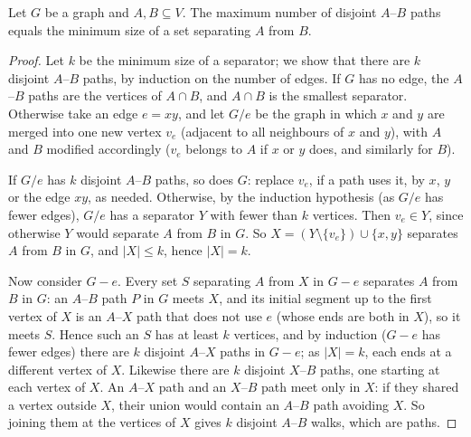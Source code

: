 \begin{theorem}[Menger, 1927]\label{thm:menger}
Let $G$ be a graph and $A,B\subseteq V$. The maximum number of disjoint $A$--$B$ paths equals the minimum size of a set separating $A$ from $B$.
\end{theorem}
\begin{proof}
Let $k$ be the minimum size of a separator; we show that there are $k$ disjoint $A$--$B$ paths, by induction on the number of edges.
If $G$ has no edge, the $A$--$B$ paths are the vertices of $A\cap B$, and $A\cap B$ is the smallest separator. Otherwise take an edge $e=xy$, and
let $G/e$ be the graph in which $x$ and $y$ are merged into one new vertex $v_e$ (adjacent to all neighbours of $x$ and $y$), with $A$ and $B$
modified accordingly ($v_e$ belongs to $A$ if $x$ or $y$ does, and similarly for $B$).

If $G/e$ has $k$ disjoint $A$--$B$ paths, so does $G$: replace $v_e$, if a path uses it, by $x$, $y$ or the edge $xy$, as needed. Otherwise, by the
induction hypothesis (as $G/e$ has fewer edges), $G/e$ has a separator $Y$ with fewer than $k$ vertices. Then $v_e\in Y$, since otherwise $Y$ would
separate $A$ from $B$ in $G$. So $X=(Y\setminus\{v_e\})\cup\{x,y\}$ separates $A$ from $B$ in $G$, and $|X|\le k$, hence $|X|=k$.

Now consider $G-e$. Every set $S$ separating $A$ from $X$ in $G-e$ separates $A$ from $B$ in $G$: an $A$--$B$ path $P$ in $G$ meets $X$, and its initial
segment up to the first vertex of $X$ is an $A$--$X$ path that does not use $e$ (whose ends are both in $X$), so it meets $S$. Hence such an $S$ has at
least $k$ vertices, and by induction ($G-e$ has fewer edges) there are $k$ disjoint $A$--$X$ paths in $G-e$; as $|X|=k$, each ends at a different
vertex of $X$. Likewise there are $k$ disjoint $X$--$B$ paths, one starting at each vertex of $X$. An $A$--$X$ path and an $X$--$B$ path meet only in $X$:
if they shared a vertex outside $X$, their union would contain an $A$--$B$ path avoiding $X$. So joining them at the vertices of $X$ gives $k$
disjoint $A$--$B$ walks, which are paths.
\end{proof}

